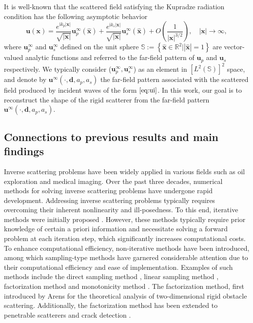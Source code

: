 \documentclass[11pt,reqno,twoside]{amsart}
\theoremstyle{definition}
\theoremstyle{remark}
\numberwithin{equation}{section}
\newcommand{\bmf}[1]{{\mathbf{#1}}}
\begin{document}
	It is well-known that the scattered field satisfying the Kupradze radiation condition has the following asymptotic behavior
	\begin{equation}\label{eq:asymptotic}
	\bmf{u}(\bmf{x})= \frac{{e}^{\mathrm{i} k_{p} |\mathbf x|}}{\sqrt{|\mathbf x|}} \mathbf u_{p}^{\infty}(\hat{\bmf{x} } )+\frac{{e}^{\mathrm{i} k_{s} |\mathbf x|}}{\sqrt{|\mathbf x|} } \mathbf u_{s}^{\infty}(\hat{\bmf{x} }) +O\left(\frac{1}{|\mathbf x|^{3 / 2}}\right) ,\quad |\mathbf x|\to \infty,
    \end{equation}
	where $\mathbf u_{p}^{\infty}$ and $\mathbf u_{s}^{\infty}$ defined on the unit sphere $\mathbb {S}:=\left\lbrace \hat{\mathbf x} \in \mathbb R^2 \big | |\hat{\mathbf x} |=1\right\rbrace$ are vector-valued analytic functions and referred to the far-field pattern of $\mathbf u_{p}$ and $\mathbf u_{s}$ respectively. We typically consider ($\mathbf u_{p}^{\infty}, \mathbf u_{s}^{\infty}$) as an element in $\left[ L^2(\mathbb S)\right] ^2$ space, and denote by $\mathbf {u}^{\infty}\left( \cdot, \mathbf d, a_p,a_s\right)$ the far-field pattern associated with the scattered field produced by incident waves of the form $\eqref{eq:ui}$. In this work, our goal is to reconstruct the shape of the rigid scatterer from the far-field pattern $\mathbf {u}^{\infty}\left( \cdot, \mathbf d, a_p,a_s\right)$.
	
	

\subsection{Connections to previous results and main findings}


Inverse scattering problems have been widely applied in various fields such as oil exploration and medical imaging. Over the past three decades, numerical methods for solving inverse scattering problems have undergone rapid development. Addressing inverse scattering problems typically requires overcoming their inherent nonlinearity and ill-posedness. To this end, iterative methods were initially proposed \cite{Roge81}. However, these methods typically require prior knowledge of certain a priori information and necessitate solving a forward problem at each iteration step, which significantly increases computational costs. To enhance computational efficiency, non-iterative methods have been introduced, among which sampling-type methods have garnered considerable attention due to their computational efficiency and ease of implementation. Examples of such methods include the direct sampling method \cite{Aren01}, linear sampling method \cite{CK96}, factorization method \cite{HKS12} and monotonicity method \cite{TR02,BU13}. The factorization method, first introduced by  Arens \cite{Aren01} for the theoretical analysis of two-dimensional rigid obstacle scattering. Additionally, the factorization method has been extended to penetrable scatterers \cite{CKAKGDK06} and crack detection \cite{JQG18}.
\end{document}
